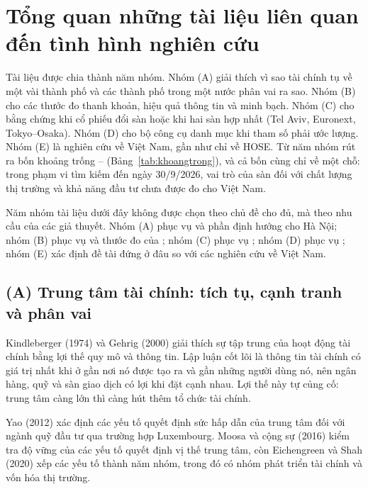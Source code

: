 \section{Tổng quan những tài liệu liên quan đến tình hình nghiên cứu}\label{sec:tongquan}

\begin{tomtat}
Tài liệu được chia thành năm nhóm. Nhóm (A) giải thích vì sao tài chính tụ về một vài thành phố và các thành phố trong một nước phân vai ra sao. Nhóm (B) cho các thước đo thanh khoản, hiệu quả thông tin và minh bạch. Nhóm (C) cho bằng chứng khi cổ phiếu đổi sàn hoặc khi hai sàn hợp nhất (Tel Aviv, Euronext, Tokyo--Osaka). Nhóm (D) cho bộ công cụ danh mục khi tham số phải ước lượng. Nhóm (E) là nghiên cứu về Việt Nam, gần như chỉ về HOSE. Từ năm nhóm rút ra bốn khoảng trống -- (Bảng~\ref{tab:khoangtrong}), và cả bốn cùng chỉ về một chỗ: trong phạm vi tìm kiếm đến ngày 30/9/2026, vai trò của sàn đối với chất lượng thị trường và khả năng đầu tư chưa được đo cho Việt Nam.
\end{tomtat}

Năm nhóm tài liệu dưới đây không được chọn theo chủ đề cho đủ, mà theo nhu cầu của các giả thuyết. Nhóm (A) phục vụ  và phần định hướng cho Hà Nội; nhóm (B) phục vụ  và thước đo của ; nhóm (C) phục vụ ; nhóm (D) phục vụ ; nhóm (E) xác định đề tài đứng ở đâu so với các nghiên cứu về Việt Nam.

\subsection*{(A) Trung tâm tài chính: tích tụ, cạnh tranh và phân vai}

Kindleberger (1974) và Gehrig (2000) giải thích sự tập trung của hoạt động tài chính bằng lợi thế quy mô và thông tin. Lập luận cốt lõi là thông tin tài chính có giá trị nhất khi ở gần nơi nó được tạo ra và gần những người dùng nó, nên ngân hàng, quỹ và sàn giao dịch có lợi khi đặt cạnh nhau. Lợi thế này tự củng cố: trung tâm càng lớn thì càng hút thêm tổ chức tài chính.

Yao (2012) xác định các yếu tố quyết định sức hấp dẫn của trung tâm đối với ngành quỹ đầu tư qua trường hợp Luxembourg. Moosa và cộng sự (2016) kiểm tra độ vững của các yếu tố quyết định vị thế trung tâm, còn Eichengreen và Shah (2020) xếp các yếu tố thành năm nhóm, trong đó có nhóm phát triển tài chính và vốn hóa thị trường.

